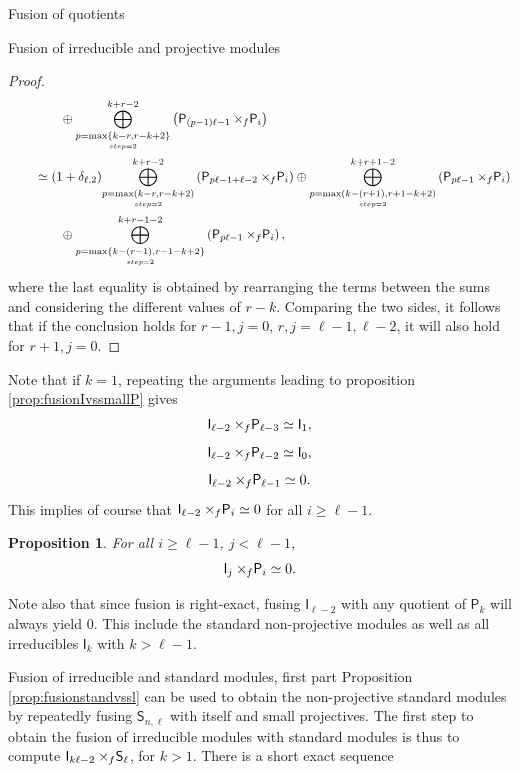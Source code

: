 \documentclass[reqno]{amsart}
\newtheorem{Prop}[Thm]{Proposition}
\newcommand{\ds}[1]{\mathsf S_{#1}}
\newcommand{\dl}[1]{\mathsf I_{#1}}
\newcommand{\dP}[1]{\mathsf P_{#1}}
\newcommand{\xf}{\times\hspace{-0.27em}_f}
\newcommand{\lc}{\ell}
\begin{document}
\begin{section}{Fusion of quotients}
\begin{subsection}{Fusion of irreducible and projective modules}
\begin{proof}
\begin{align*}
	& \qquad \qquad  \oplus \overset{k+r-2}{\underset{\underset{step=2}{p = \max\left\{k-r, r-k +2 \right\}}}{\bigoplus}}\left( \dP{(p-1) \lc -1} \xf \dP{i}\right)\\
	& \qquad \simeq (1 + \delta_{\ell ,2})\overset{k+r-2}{\underset{\underset{step=2}{p = \max\left(k-r, r-k +2 \right)}}{\bigoplus}}\left( \dP{p \lc -1 +\ell -2} \xf \dP{i}\right) \oplus \overset{k+r+1-2}{\underset{\underset{step=2}{p = \max\left(k-(r+1), r+1-k +2 \right)}}{\bigoplus}}\left( \dP{p \lc -1} \xf \dP{i}\right) \\
	& \qquad \qquad  \oplus \overset{k+r-1-2}{\underset{\underset{step=2}{p = \max\left\{k-(r-1), r-1-k +2 \right\}}}{\bigoplus}}\left( \dP{p \lc -1} \xf \dP{i}\right),
\end{align*}
where the last equality is obtained by rearranging the terms between the sums and considering the different values of $r-k$. Comparing the two sides, it follows that if the conclusion holds for $r-1, j=0$, $r,j=\lc-1, \lc-2 $, it will also hold for $r+1,j=0$.
\end{proof}
Note that if $k=1$, repeating the arguments leading to proposition \ref{prop:fusionIvssmallP} gives
\begin{equation*}
\dl{\lc-2} \xf \dP{\lc-3} \simeq \dl{1},
\end{equation*}
\begin{equation*}
\dl{\lc-2} \xf \dP{\lc-2} \simeq \dl{0},
\end{equation*}
\begin{equation*}
\dl{\lc-2} \xf \dP{\lc-1} \simeq 0.
\end{equation*}
This implies of course that $\dl{\lc-2} \xf \dP{i}\simeq 0$ for all $i\geq \lc-1$.
\begin{Prop}\label{prop:fusionIWeird}
For all $i\geq \lc-1$, $j < \ell -1$,
\begin{equation}
\dl{j} \xf \dP{i} \simeq 0.
\end{equation}
\end{Prop}
Note also that since fusion is right-exact, fusing $\dl{\lc-2}$ with any quotient of $\dP{k}$ will always yield $0$. This include the standard non-projective modules as well as all irreducibles $\dl{k}$ with $k>\lc-1$.
\end{subsection}
\begin{subsection}{Fusion of irreducible and standard modules, first part}\label{sec:fusionIvsS1}
Proposition \ref{prop:fusionstandvssl} can be used to obtain the non-projective standard modules by repeatedly fusing $\ds{n,\lc}$ with itself and small projectives. The first step to obtain the fusion of irreducible modules with standard modules is thus to compute $\dl{k \lc -2} \xf \ds{\lc}$, for $k>1$. There is a short exact sequence 

\end{subsection}
\end{section}
\end{document}
